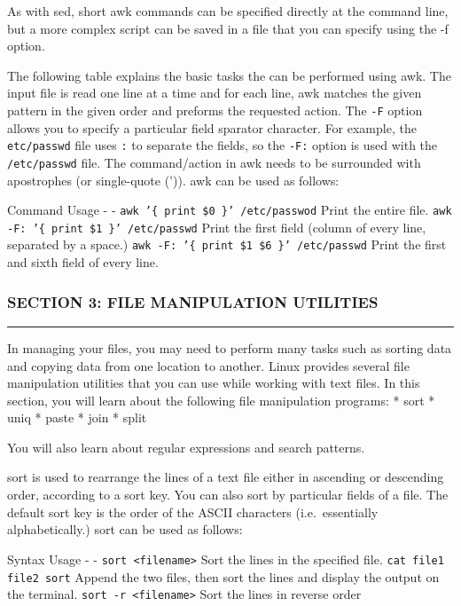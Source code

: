As with sed, short awk commands can be specified directly at the command
line, but a more complex script can be saved in a file that you can
specify using the -f option.

The following table explains the basic tasks the can be performed using
awk. The input file is read one line at a time and for each line, awk
matches the given pattern in the given order and preforms the requested
action. The \texttt{-F} option allows you to specify a particular field
sparator character. For example, the \texttt{etc/passwd} file uses
\texttt{:} to separate the fields, so the \texttt{-F:} option is used
with the \texttt{/etc/passwd} file. The command/action in awk needs to
be surrounded with apostrophes (or single-quote (')). awk can be used as
follows:

Command \textbar{} Usage - \textbar{} -
\texttt{awk '\{ print \$0 \}' /etc/passwod} \textbar{} Print the entire
file. \texttt{awk -F: '\{ print \$1 \}' /etc/passwd} \textbar{} Print
the first field (column of every line, separated by a space.)
\texttt{awk -F: '\{ print \$1 \$6 \}' /etc/passwd} \textbar{} Print the
first and sixth field of every line.

\subsubsection{SECTION 3: FILE MANIPULATION
UTILITIES}\label{section-3-file-manipulation-utilities}

\begin{center}\rule{3in}{0.4pt}\end{center}

In managing your files, you may need to perform many tasks such as
sorting data and copying data from one location to another. Linux
provides several file manipulation utilities that you can use while
working with text files. In this section, you will learn about the
following file manipulation programs: * sort * uniq * paste * join *
split

You will also learn about regular expressions and search patterns.

sort is used to rearrange the lines of a text file either in ascending
or descending order, according to a sort key. You can also sort by
particular fields of a file. The default sort key is the order of the
ASCII characters (i.e.~essentially alphabetically.) sort can be used as
follows:

Syntax \textbar{} Usage - \textbar{} -
\texttt{sort \textless{}filename\textgreater{}} \textbar{} Sort the
lines in the specified file. \texttt{cat file1 file2 sort} \textbar{}
Append the two files, then sort the lines and display the output on the
terminal. \texttt{sort -r \textless{}filename\textgreater{}} \textbar{}
Sort the lines in reverse order

